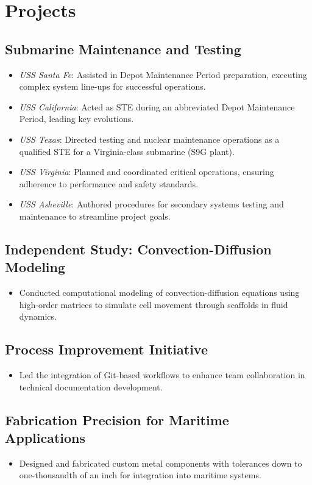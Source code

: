 \documentclass[10pt,a4paper]{article}
\begin{document}
\newpage

\section*{Projects}
\subsection{Submarine Maintenance and Testing}  
\begin{itemize}[noitemsep]
    \item \textit{USS Santa Fe}: Assisted in Depot Maintenance Period preparation, executing complex system line-ups for successful operations.
    \item \textit{USS California}: Acted as STE during an abbreviated Depot Maintenance Period, leading key evolutions.
    \item \textit{USS Texas}: Directed testing and nuclear maintenance operations as a qualified STE for a Virginia-class submarine (S9G plant).
    \item \textit{USS Virginia}: Planned and coordinated critical operations, ensuring adherence to performance and safety standards.
    \item \textit{USS Asheville}: Authored procedures for secondary systems testing and maintenance to streamline project goals.
\end{itemize}

\subsection{Independent Study: Convection-Diffusion Modeling}  
\begin{itemize}[noitemsep]
    \item Conducted computational modeling of convection-diffusion equations using high-order matrices to simulate cell movement through scaffolds in fluid dynamics.
\end{itemize}

\subsection{Process Improvement Initiative}  
\begin{itemize}[noitemsep]
    \item Led the integration of Git-based workflows to enhance team collaboration in technical documentation development.
\end{itemize}

\subsection{Fabrication Precision for Maritime Applications}  
\begin{itemize}[noitemsep]
    \item Designed and fabricated custom metal components with tolerances down to one-thousandth of an inch for integration into maritime systems.
\end{itemize}
\end{document}
